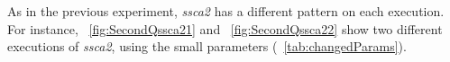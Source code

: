 As in the previous experiment, \emph{ssca2} has a different pattern on each execution. For instance, \figurename~\ref{fig:SecondQssca21} and
\figurename~\ref{fig:SecondQssca22} show two different executions of  \emph{ssca2}, using the small parameters (\tablename~\ref{tab:changedParams}).
\begin{figure}[!tb]
	\centering
\end{figure}

